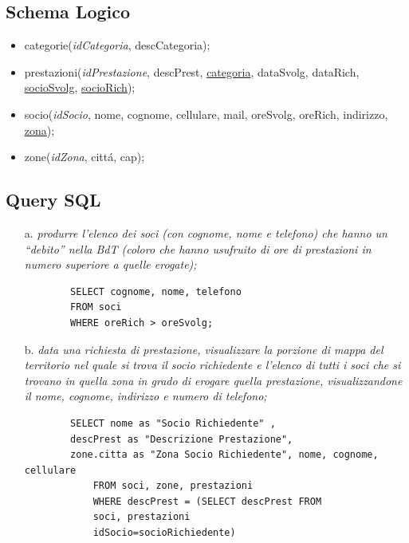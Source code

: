 ﻿\documentclass[a4paper, 12pt]{article}
\begin{document}
\subsection{Schema Logico}
\begin{itemize}
    \item categorie(\textit{idCategoria}, descCategoria);
    \item prestazioni(\textit{idPrestazione}, descPrest, \underline{categoria},  dataSvolg, dataRich, \underline{socioSvolg}, \underline{socioRich});
    \item socio(\textit{idSocio}, nome, cognome, cellulare, mail, oreSvolg, oreRich, indirizzo, \underline{zona});
    \item zone(\textit{idZona}, citt\'a, cap);
\end{itemize}

\subsection{Query SQL}
\begin{enumerate}
    \item [a.] \textit{produrre l’elenco dei soci (con cognome, nome e telefono) che hanno un “debito” nella BdT
(coloro che hanno usufruito di ore di prestazioni in numero superiore a quelle erogate);}
    \begin{verbatim}
        SELECT cognome, nome, telefono
        FROM soci
        WHERE oreRich > oreSvolg;
    \end{verbatim}
    \item [b.] \textit{data una richiesta di prestazione, visualizzare la porzione di mappa del territorio nel quale si
trova il socio richiedente e l’elenco di tutti i soci che si trovano in quella zona in grado di
erogare quella prestazione, visualizzandone il nome, cognome, indirizzo e numero di
telefono;}
    \begin{verbatim}
        SELECT nome as "Socio Richiedente" ,
        descPrest as "Descrizione Prestazione",  
        zone.citta as "Zona Socio Richiedente", nome, cognome, cellulare 
            FROM soci, zone, prestazioni
            WHERE descPrest = (SELECT descPrest FROM
            soci, prestazioni 
            idSocio=socioRichiedente)
    \end{verbatim}
\end{enumerate}
\end{document}
